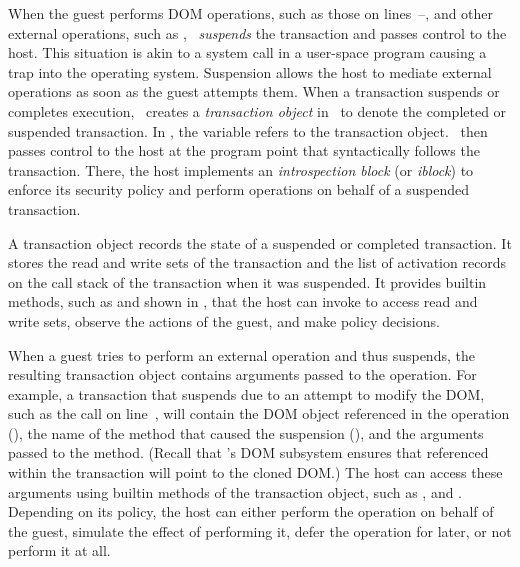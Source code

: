 When the guest performs DOM operations, such as those on
lines~--, and other external operations, such as
, \txjs\ \textit{suspends} the transaction and passes
control to the host.  This situation is akin to a system call in a user-space
program causing a trap into the operating system.  Suspension allows the host to
mediate external operations as soon as the guest attempts them.  When a
transaction suspends or completes execution, \txjs\ creates a
\textit{transaction object} in \js\ to denote the completed or suspended
transaction. In , the variable  refers to the
transaction object. \txjs\ then passes control to the host at the program point
that syntactically follows the transaction. There, the host implements an
\textit{introspection block} (or \textit{iblock}) to enforce its security policy
and perform operations on behalf of a suspended transaction.

\label{section:motivation:txobj}
%
A transaction object records the state of a suspended or completed transaction.
It stores the read and write sets of the transaction and the list of activation
records on the call stack of the transaction when it was suspended.  It
provides builtin methods, such as  and 
shown in , that the host can invoke to access read and
write sets, observe the actions of the guest, and make policy decisions. 

When a guest tries to perform an external operation and thus suspends, the
resulting transaction object contains arguments passed to the operation. For
example, a transaction that suspends due to an attempt to modify the DOM\@, such
as the call  on line~, will contain the DOM
object referenced in the operation (), the name of the method
that caused the suspension (), and the arguments passed to the
method.  (Recall that \txjs's DOM subsystem ensures that 
referenced within the transaction will point to the cloned DOM\@.)  The host can
access these arguments using builtin methods of the transaction object, such as
,  and . 
Depending on its policy, the host can either perform
the operation on behalf of the guest, simulate the effect of performing it,
defer the operation for later, or not perform it at all.

